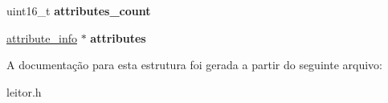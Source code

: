 \begin{DoxyCompactItemize}
\item 
\hypertarget{structcode__attribute_afc69998658e6fc6b2a7cf29bedbf73d1}{uint16\-\_\-t {\bfseries attributes\-\_\-count}}\label{structcode__attribute_afc69998658e6fc6b2a7cf29bedbf73d1}

\item 
\hypertarget{structcode__attribute_a9f45491da8c177e471b75c9539bb37b2}{\hyperlink{structattribute__info}{attribute\-\_\-info} $\ast$ {\bfseries attributes}}\label{structcode__attribute_a9f45491da8c177e471b75c9539bb37b2}

\end{DoxyCompactItemize}


A documentação para esta estrutura foi gerada a partir do seguinte arquivo\-:\begin{DoxyCompactItemize}
\item 
leitor.\-h\end{DoxyCompactItemize}
